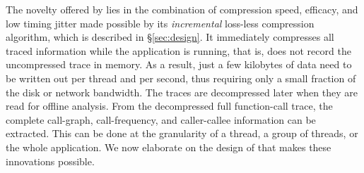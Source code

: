 The novelty offered by \parlot lies in the combination of compression
speed, efficacy, and low timing jitter
made possible by its {\em incremental}
loss-less compression algorithm, which is
described in \S\ref{sec:design}.
%
It immediately compresses all traced information while the application is running, that is, \parlot does not record the uncompressed trace in memory. 
%
As a result, just a few kilobytes of data need to be written out per thread and per second, thus requiring only a small fraction of the  disk or network bandwidth. 
%
The traces are decompressed later when they are read for offline analysis.
%
From the decompressed full function-call trace, the complete call-graph, 
call-frequency, and caller-callee information can be extracted. 
%
This can be done at the granularity of a thread, a group of threads, or the whole application.
%
We now elaborate on the design of \parlot that makes
these innovations possible.







